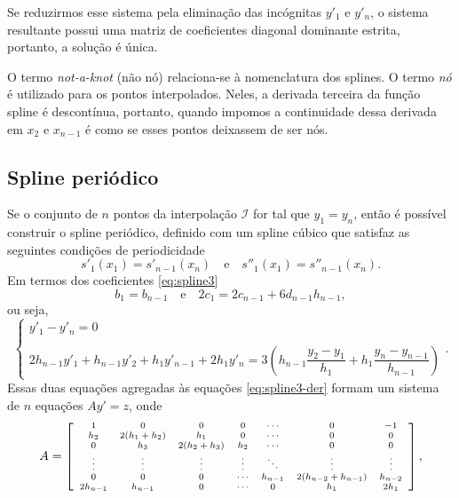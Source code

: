 Se reduzirmos esse sistema pela eliminação das incógnitas $y'_1$ e $y'_n$, o sistema resultante possui uma matriz de coeficientes diagonal dominante estrita, portanto, a solução é única.

O termo \textit{not-a-knot} (não nó) relaciona-se à nomenclatura dos splines. O termo \textit{nó} é utilizado para os pontos interpolados. Neles, a derivada terceira da função spline é descontínua, portanto, quando impomos a continuidade dessa derivada em $x_2$ e $x_{n-1}$ é como se esses pontos deixassem de ser nós.

\subsection{Spline periódico}
Se o conjunto de $n$ pontos da interpolação $\mathcal{I}$ for tal que $y_1=y_n$, então é possível construir o spline periódico, definido com um spline cúbico que satisfaz as seguintes condições de periodicidade
\begin{equation}
	s'_1(x_1)=s'_{n-1}(x_n)\quad\text{e}\quad	s''_1(x_1)=s''_{n-1}(x_n).
\end{equation}
Em termos dos coeficientes \eqref{eq:spline3}
\begin{equation}
	b_1=b_{n-1}\quad\text{e}\quad 2c_1=2c_{n-1}+6d_{n-1}h_{n-1},
\end{equation}
ou seja,
\begin{equation}
	\left\{\begin{array}{l}
			y'_1-y'_n=0\\
			\\
			2h_{n-1}y'_1+h_{n-1}y'_2+h_1y'_{n-1}+2h_1y'_n=3\left(h_{n-1}\dfrac{y_2-y_1}{h_1}+h_1\dfrac{y_n-y_{n-1}}{h_{n-1}}\right)
		\end{array}
	\right. .
\end{equation}
Essas duas equações agregadas às equações \eqref{eq:spline3-der} formam um sistema de $n$ equações $Ay' = z$, onde
\begin{equation}
	\begin{scriptsize}
		A=\left[\begin{array}{ccccccc}
			1&0&0&0&\cdots&0&-1\\
			h_2&2(h_1+h_2)&h_1&0&\cdots&0&0\\
			0&h_3&2(h_2+h_3)&h_2&\cdots&0&0\\
			\vdots&\vdots&\vdots&\vdots&\ddots&\vdots&\vdots\\
			0&0&0&\cdots&h_{n-1} & 2(h_{n-2}+h_{n-1})&h_{n-2}\\
			2h_{n-1}&h_{n-1}&0&\cdots &0&h_1&2h_1
			\end{array}\right],
	\end{scriptsize}
\end{equation}
